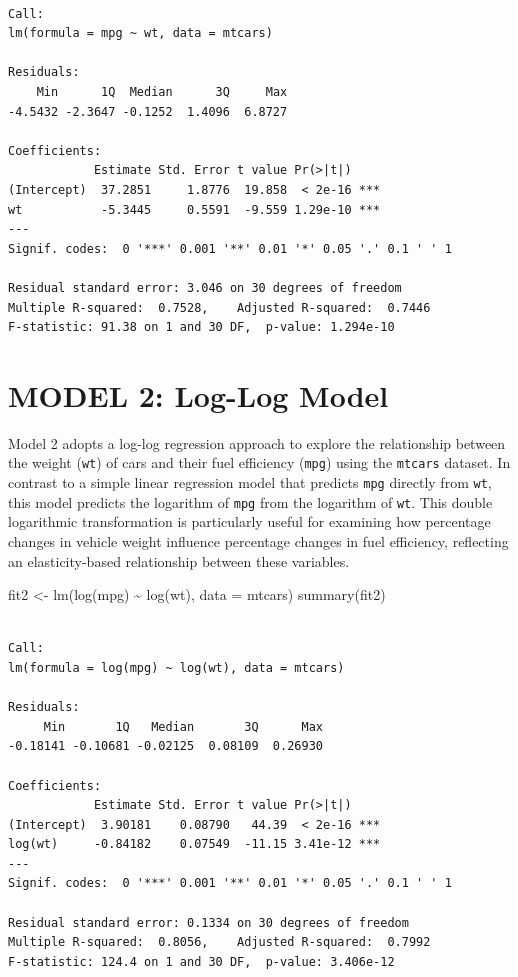 \documentclass[
  letterpaper,
  DIV=11,
  numbers=noendperiod]{scrreport}
\newenvironment{Shaded}{\begin{snugshade}}{\end{snugshade}}
\newcommand{\AttributeTok}[1]{\textcolor[rgb]{0.40,0.45,0.13}{#1}}
\newcommand{\FunctionTok}[1]{\textcolor[rgb]{0.28,0.35,0.67}{#1}}
\newcommand{\NormalTok}[1]{\textcolor[rgb]{0.00,0.23,0.31}{#1}}
\newcommand{\OtherTok}[1]{\textcolor[rgb]{0.00,0.23,0.31}{#1}}
\newcommand{\SpecialCharTok}[1]{\textcolor[rgb]{0.37,0.37,0.37}{#1}}
\begin{document}
\begin{verbatim}

Call:
lm(formula = mpg ~ wt, data = mtcars)

Residuals:
    Min      1Q  Median      3Q     Max 
-4.5432 -2.3647 -0.1252  1.4096  6.8727 

Coefficients:
            Estimate Std. Error t value Pr(>|t|)    
(Intercept)  37.2851     1.8776  19.858  < 2e-16 ***
wt           -5.3445     0.5591  -9.559 1.29e-10 ***
---
Signif. codes:  0 '***' 0.001 '**' 0.01 '*' 0.05 '.' 0.1 ' ' 1

Residual standard error: 3.046 on 30 degrees of freedom
Multiple R-squared:  0.7528,    Adjusted R-squared:  0.7446 
F-statistic: 91.38 on 1 and 30 DF,  p-value: 1.294e-10
\end{verbatim}

\section{MODEL 2: Log-Log Model}\label{model-2-log-log-model}

Model 2 adopts a log-log regression approach to explore the relationship
between the weight (\texttt{wt}) of cars and their fuel efficiency
(\texttt{mpg}) using the \texttt{mtcars} dataset. In contrast to a
simple linear regression model that predicts \texttt{mpg} directly from
\texttt{wt}, this model predicts the logarithm of \texttt{mpg} from the
logarithm of \texttt{wt}. This double logarithmic transformation is
particularly useful for examining how percentage changes in vehicle
weight influence percentage changes in fuel efficiency, reflecting an
elasticity-based relationship between these variables.

\begin{Shaded}
\begin{Highlighting}[]
\NormalTok{fit2 }\OtherTok{\textless{}{-}} \FunctionTok{lm}\NormalTok{(}\FunctionTok{log}\NormalTok{(mpg) }\SpecialCharTok{\textasciitilde{}} \FunctionTok{log}\NormalTok{(wt), }\AttributeTok{data =}\NormalTok{ mtcars)}
\FunctionTok{summary}\NormalTok{(fit2)}
\end{Highlighting}
\end{Shaded}

\begin{verbatim}

Call:
lm(formula = log(mpg) ~ log(wt), data = mtcars)

Residuals:
     Min       1Q   Median       3Q      Max 
-0.18141 -0.10681 -0.02125  0.08109  0.26930 

Coefficients:
            Estimate Std. Error t value Pr(>|t|)    
(Intercept)  3.90181    0.08790   44.39  < 2e-16 ***
log(wt)     -0.84182    0.07549  -11.15 3.41e-12 ***
---
Signif. codes:  0 '***' 0.001 '**' 0.01 '*' 0.05 '.' 0.1 ' ' 1

Residual standard error: 0.1334 on 30 degrees of freedom
Multiple R-squared:  0.8056,    Adjusted R-squared:  0.7992 
F-statistic: 124.4 on 1 and 30 DF,  p-value: 3.406e-12
\end{verbatim}
\end{document}
